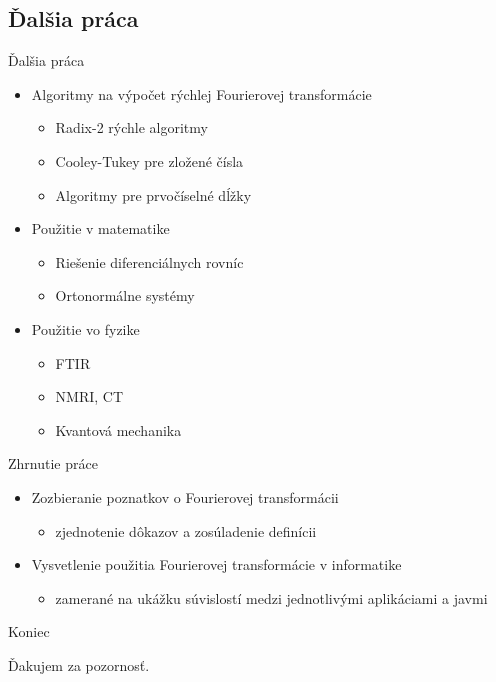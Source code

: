 \documentclass{beamer}
\begin{document}
\subsection{Ďalšia práca}
\begin{frame}{Ďalšia práca}
    \begin{itemize}
        \item Algoritmy na výpočet rýchlej Fourierovej transformácie
            \begin{itemize}
                \item Radix-2 rýchle algoritmy
                \item Cooley-Tukey pre zložené čísla
                \item Algoritmy pre prvočíselné dĺžky
            \end{itemize}
        \item Použitie v matematike
            \begin{itemize}
                \item Riešenie diferenciálnych rovníc
                \item Ortonormálne systémy
            \end{itemize}
        \item Použitie vo fyzike
            \begin{itemize}
                \item FTIR
                \item NMRI, CT
                \item Kvantová mechanika
            \end{itemize}
    \end{itemize}
\end{frame}

\begin{frame}{Zhrnutie práce}
    \begin{itemize}
        \item Zozbieranie poznatkov o Fourierovej transformácii
            \begin{itemize}
            \item zjednotenie dôkazov a zosúladenie definícii
            \end{itemize}
        \item Vysvetlenie použitia Fourierovej transformácie v
        informatike
            \begin{itemize}
            \item zamerané na ukážku súvislostí medzi jednotlivými
            aplikáciami a javmi
            \end{itemize}

    \end{itemize}
\end{frame}

\begin{frame}{Koniec}
    \begin{table}
    \begin{centering}
        \large Ďakujem za pozornosť.
    \end{centering}
    \end{table}
\end{frame}
\end{document}
